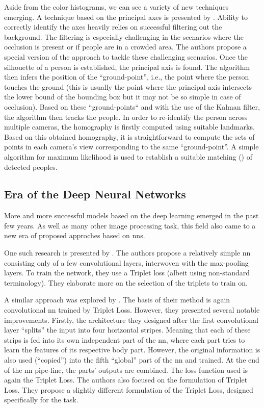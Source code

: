 Aside from the color histograms, we can see a variety of new techniques emerging. A technique based on the principal axes is presented by \cite{hu2006principal}. Ability to correctly identify the axes heavily relies on successful filtering out the background. The filtering is especially challenging in the scenarios where the occlusion is present or if people are in a crowded area. The authors propose a special version of the approach to tackle these challenging scenarios. Once the silhouette of a person is established, the principal axis is found. The algorithm then infers the position of the ``ground-point'', i.e., the point where the person touches the ground (this is usually the point where the principal axis intersects the lower bound of the bounding box but it may not be so simple in case of occlusion). Based on these ``ground-points`` and with the use of the Kalman filter, the algorithm then tracks the people. In order to re-identify the person across multiple cameras, the homography is firstly computed using suitable landmarks. Based on this obtained homography, it is straightforward to compute the sets of points in each camera's view corresponding to the same ``ground-point''. A simple algorithm for maximum likelihood is used to establish a suitable matching (\reid{}) of detected peoples.

\subsection{Era of the Deep Neural Networks}

More and more successful models based on the deep learning emerged in the past few years. As well as many other image processing task, this field also came to a new era of proposed approches based on \glspl{nn}.

One such research is presented by \cite{ding2015deep}. The authors propose a relatively simple \gls{nn} consisting only of a few convolutional layers, interwoven with the max-pooling layers. To train the network, they use a Triplet loss (albeit using non-standard terminology). They elaborate more on the selection of the triplets to train on.

A similar approach was explored by \cite{cheng2016person}. The basis of their method is again convolutional \gls{nn} trained by Triplet Loss. However, they presented several notable improvements. Firstly, the architecture they designed after the first convolutional layer ``splits'' the input into four horizontal stripes. Meaning that each of these strips is fed into its own independent part of the \gls{nn}, where each part tries to learn the features of its respective body part. However, the original information is also used (``copied'') into the fifth ``global'' part of the \gls{nn} and trained. At the end of the \gls{nn} pipe-line, the parts' outputs are combined. The loss function used is again the Triplet Loss. The authors also focused on the formulation of Triplet Loss. They propose a slightly different formulation of the Triplet Loss, designed specifically for the \reid{} task.

